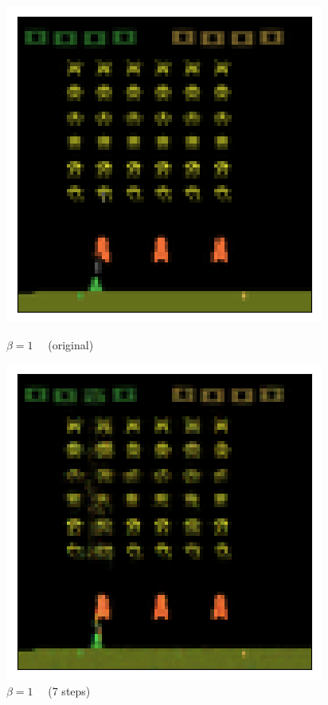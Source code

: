 \begin{figure}[h!]
\centering
\captionsetup{justification=centering}
\begin{multicols}{4}
    \includegraphics[scale=0.4]{figures/results/colour_separated/beta_1_posterior_sample_original.png}
    \caption{$\beta=1\quad$ (original)}
    \includegraphics[scale=0.4]{figures/results/colour_separated/beta_1_posterior_sample_7.png}
    \caption{$\beta=1\quad$ (7 steps)}

\end{multicols}
\end{figure}
